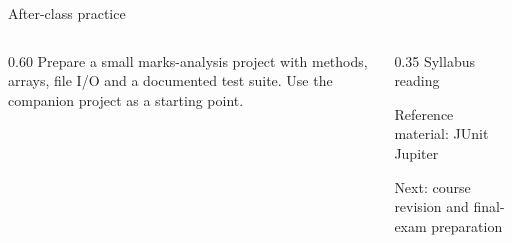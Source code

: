 \documentclass[10pt,aspectratio=169]{beamer}
\begin{document}
\begin{frame}[fragile,t]{After-class practice}
\begin{columns}[T,onlytextwidth]\begin{column}{0.60\textwidth}
Prepare a small marks-analysis project with methods, arrays, file I/O and a documented test suite. Use the companion project as a starting point.
\end{column}\begin{column}{0.35\textwidth}\small
Syllabus reading\par Reference material: JUnit Jupiter

Next: course revision and final-exam preparation
\end{column}\end{columns}
\end{frame}
\end{document}
